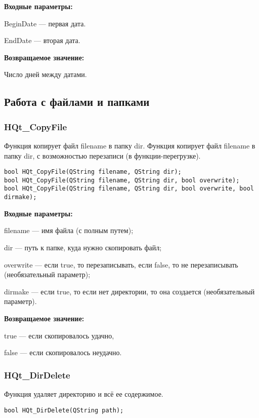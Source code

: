 \documentclass[a4paper,12pt]{article}
\begin{document}
\textbf{Входные параметры:}

BeginDate --- первая дата.

EndDate --- вторая дата.

\textbf{Возвращаемое значение:}

Число дней между датами.


\subsection{Работа с файлами и папками}

\subsubsection{HQt\_CopyFile}\label{HQt_CopyFile}

Функция копирует файл filename в папку dir. Функция копирует файл filename в папку dir, с возможностью перезаписи (в функции-перегрузке).


\begin{lstlisting}[label=code_syntax_HQt_CopyFile,caption=Синтаксис]
bool HQt_CopyFile(QString filename, QString dir);
bool HQt_CopyFile(QString filename, QString dir, bool overwrite);
bool HQt_CopyFile(QString filename, QString dir, bool overwrite, bool dirmake);
\end{lstlisting}

\textbf{Входные параметры:}

filename --- имя файла (с полным путем);
 
dir --- путь к папке, куда нужно скопировать файл;

overwrite --- если true, то перезаписывать, если false, то не перезаписывать (необязательный параметр);

dirmake --- если true, то если нет директории, то она создается (необязательный параметр).

\textbf{Возвращаемое значение:}

true --- если скопировалось удачно,
 
false --- если скопировалось неудачно.


\subsubsection{HQt\_DirDelete}\label{HQt_DirDelete}

Функция удаляет директорию и всё ее содержимое.


\begin{lstlisting}[label=code_syntax_HQt_DirDelete,caption=Синтаксис]
bool HQt_DirDelete(QString path);
\end{lstlisting}
\end{document}
